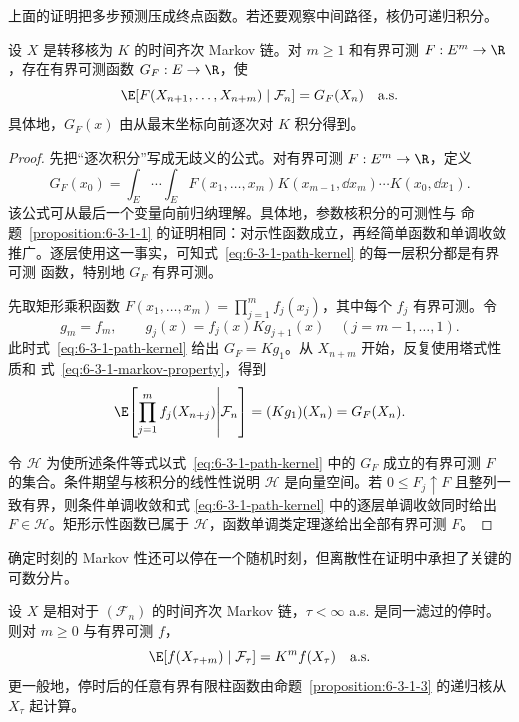上面的证明把多步预测压成终点函数。若还要观察中间路径，核仍可递归积分。

\begin{proposition}\label{proposition:6-3-1-3}
设 $X$ 是转移核为 $K$ 的时间齐次 Markov 链。对 $m\geq1$ 和有界可测
$F:E^m\to\R$，存在有界可测函数 $G_F:E\to\R$，使
\[
 \E[F(X_{n+1},\ldots,X_{n+m})\mid\mathcal F_n]=G_F(X_n)\quad\text{a.s.}
\]
具体地，$G_F(x)$ 由从最末坐标向前逐次对 $K$ 积分得到。
\end{proposition}

\begin{proof}
先把“逐次积分”写成无歧义的公式。对有界可测
$F:E^m\to\R$，定义
\begin{equation}\label{eq:6-3-1-path-kernel}
 G_F(x_0)=
 \int_E\!\cdots\!\int_E
 F(x_1,\ldots,x_m)
 K(x_{m-1},\dd x_m)\cdots K(x_0,\dd x_1).
\end{equation}
该公式可从最后一个变量向前归纳理解。具体地，参数核积分的可测性与
命题~\ref{proposition:6-3-1-1} 的证明相同：对示性函数成立，再经简单函数和单调收敛
推广。逐层使用这一事实，可知式~\eqref{eq:6-3-1-path-kernel} 的每一层积分都是有界可测
函数，特别地 $G_F$ 有界可测。

先取矩形乘积函数
$F(x_1,\ldots,x_m)=\prod_{j=1}^mf_j(x_j)$，其中每个 $f_j$ 有界可测。令
\[
 g_m=f_m,\qquad g_j(x)=f_j(x)K g_{j+1}(x)\quad(j=m-1,\ldots,1).
\]
此时式~\eqref{eq:6-3-1-path-kernel} 给出 $G_F=Kg_1$。从 $X_{n+m}$ 开始，反复使用塔式性质和
式~\eqref{eq:6-3-1-markov-property}，得到
\[
 \E\!\left[\prod_{j=1}^mf_j(X_{n+j})\middle|\mathcal F_n\right]
 =(Kg_1)(X_n)=G_F(X_n).
\]

令 $\mathcal H$ 为使所述条件等式以式~\eqref{eq:6-3-1-path-kernel} 中的 $G_F$ 成立的有界可测
$F$ 的集合。条件期望与核积分的线性性说明 $\mathcal H$ 是向量空间。若
$0\le F_j\uparrow F$ 且整列一致有界，则条件单调收敛和式
\eqref{eq:6-3-1-path-kernel} 中的逐层单调收敛同时给出 $F\in\mathcal H$。矩形示性函数已属于
$\mathcal H$，函数单调类定理遂给出全部有界可测 $F$。
\end{proof}

确定时刻的 Markov 性还可以停在一个随机时刻，但离散性在证明中承担了关键的可数分片。

\begin{theorem}\label{theorem:6-3-1-strong-markov}
设 $X$ 是相对于 $(\mathcal F_n)$ 的时间齐次 Markov 链，$\tau<\infty$ a.s. 是同一滤过的停时。
则对 $m\geq0$ 与有界可测 $f$，
\[
 \E[f(X_{\tau+m})\mid\mathcal F_\tau]=K^mf(X_\tau)\quad\text{a.s.}
\]
更一般地，停时后的任意有界有限柱函数由命题~\ref{proposition:6-3-1-3} 的递归核从
$X_\tau$ 起计算。
\end{theorem}

